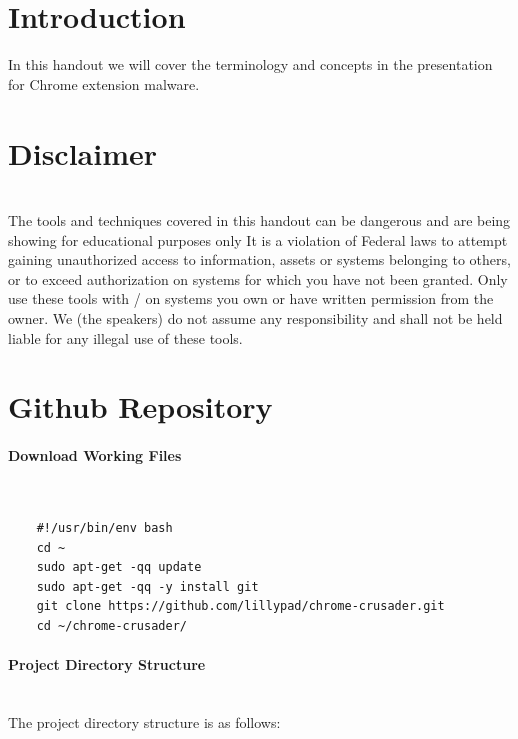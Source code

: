 \documentclass{article}
\newcommand\tab[1][0.5cm]{\hspace*{#1}}
\begin{document}
\pagebreak

\tableofcontents

\pagebreak

\section{Introduction}
\tab In this handout we will cover the terminology and concepts in the presentation for Chrome extension malware.\\

\section{Disclaimer}\mbox{}\\
\tab The tools and techniques covered in this handout can be dangerous and are being showing for educational purposes only
It is a violation of Federal laws to attempt gaining unauthorized access to information, assets or systems belonging to others, or to exceed authorization on systems for which you have not been granted.
Only use these tools with / on systems you own or have written permission from the owner. We (the speakers) do not assume any responsibility and shall not be held liable for any illegal use of these tools.\\

\pagebreak

\section{Github Repository}
\paragraph{Download Working Files}\mbox{}\\
\begin{tcolorbox}[title=\href{https://github.com/lillypad/chrome-crusader}{chrome-crusader}]
  \begin{verbatim}
    #!/usr/bin/env bash
    cd ~
    sudo apt-get -qq update
    sudo apt-get -qq -y install git
    git clone https://github.com/lillypad/chrome-crusader.git
    cd ~/chrome-crusader/
  \end{verbatim}
\end{tcolorbox}
\paragraph{Project Directory Structure}\mbox{}\\
\newline
\tab The project directory structure is as follows:\\
\end{document}
